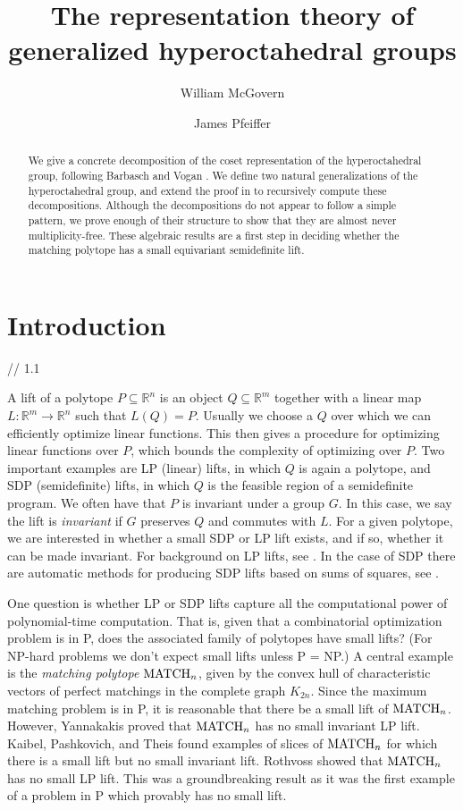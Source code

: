 \documentclass[12pt]{amsart}
\title{The representation theory of generalized hyperoctahedral groups}
\author{William McGovern}
\author{James Pfeiffer}
\numberwithin{theorem}{section}
\newcommand{\RR}{\mathbb{R}}
\newcommand{\MATCH}{\textup{MATCH}}
\begin{document}
\begin{abstract}
We give a concrete decomposition of the coset representation of the hyperoctahedral group, following Barbasch and Vogan \cite{bv}.
We define two natural generalizations of the hyperoctahedral group, and extend the proof in \cite{bv} to recursively compute these decompositions.
Although the decompositions do not appear to follow a simple pattern, we prove enough of their structure to show that they are almost never multiplicity-free.
These algebraic results are a first step in deciding whether the matching polytope has a small equivariant semidefinite lift.
\end{abstract}
\maketitle

\section{Introduction} \label{BV:Introduction}

// 1.1

A lift of a polytope $P \subseteq \RR^n$ is an object $Q \subseteq \RR^m$ together with a linear map $L: \RR^m \to \RR^n$ such that $L(Q) = P$.
Usually we choose a $Q$ over which we can efficiently optimize linear functions.
This then gives a procedure for optimizing linear functions over $P$, which bounds the complexity of optimizing over $P$.
Two important examples are LP (linear) lifts, in which $Q$ is again a polytope, and SDP (semidefinite) lifts, in which $Q$ is the feasible region of a semidefinite program.
We often have that $P$ is invariant under a group $G$.
In this case, we say the lift is {\em invariant} if $G$ preserves $Q$ and commutes with $L$.
For a given polytope, we are interested in whether a small SDP or LP lift exists, and if so, whether it can be made invariant.
For background on LP lifts, see \cite{yannakakis1988expressing}.
In the case of SDP there are automatic methods for producing SDP lifts based on sums of squares, see \cite{gpt}.

One question is whether LP or SDP lifts capture all the computational power of polynomial-time computation.
That is, given that a combinatorial optimization problem is in P, does the associated family of polytopes have small lifts?
(For NP-hard problems we don't expect small lifts unless P = NP.)
A central example is the {\em matching polytope} $\MATCH_n$, given by the convex hull of characteristic vectors of perfect matchings in the complete graph $K_{2n}$.
Since the maximum matching problem is in P, it is reasonable that there be a small lift of $\MATCH_n$.
However, Yannakakis \cite{yannakakis1988expressing} proved that $\MATCH_n$ has no small invariant LP lift.
Kaibel, Pashkovich, and Theis \cite{kaibel2010symmetry} found examples of slices of $\MATCH_n$ for which there is a small lift but no small invariant lift.
Rothvoss \cite{rothvoss2013matching} showed that $\MATCH_n$ has no small LP lift.
This was a groundbreaking result as it was the first example of a problem in P which provably has no small lift.
\end{document}

